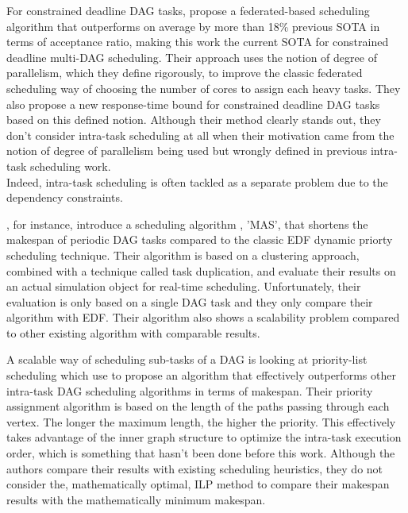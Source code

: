 For constrained deadline DAG tasks, 
\cite{He2023DegreeOfParallelism} propose a federated-based
scheduling algorithm that outperforms on average by more than 18\%
previous SOTA\cite{Jiang2023SchedVirtualProcs} in terms of acceptance
ratio, making this work the current SOTA for constrained deadline multi-DAG scheduling.
Their approach uses the notion of degree of parallelism, which they 
define rigorously, to improve the classic federated scheduling way of 
choosing the number of cores to assign each heavy tasks.
They also propose a new response-time bound for constrained deadline DAG tasks
based on this defined notion.
Although their method clearly stands out,
they don't consider intra-task scheduling at all 
when their motivation came from the notion 
of degree of parallelism being used
but wrongly defined in previous intra-task scheduling work\cite{Zhao2022DAGsched}\cite{zhao2020DAGsched}.\\


Indeed, intra-task scheduling\cite{He2019DagIntra}\cite{Xiao2019}
\cite{Shi2024DagExecGroups}\cite{Zhao2024GATDRLmodel}\cite{Lee2021GlobalDagSchedDRL}
\cite{GuanFRTDS2020RL} is often tackled as a separate
problem due to the dependency constraints.

\cite{Xiao2019}, for instance, introduce a scheduling algorithm 
, 'MAS', that shortens the makespan of periodic DAG tasks
compared to the classic EDF dynamic priorty scheduling technique.
Their algorithm is based on a clustering approach, combined with
a technique called task duplication, and evaluate their results
on an actual simulation object for real-time scheduling.
Unfortunately, their evaluation is only based on a single DAG task
and they only compare their algorithm with EDF.
Their algorithm also shows a scalability problem compared to 
other existing algorithm with comparable results.

A scalable way of scheduling sub-tasks of a DAG 
is looking at priority-list scheduling
which \cite{He2019DagIntra} use to propose 
an algorithm that effectively outperforms
other intra-task DAG scheduling algorithms
in terms of makespan.
Their priority assignment algorithm
is based on the length of the paths passing through each vertex.
The longer the maximum length, the higher the priority.
This effectively takes advantage of the inner graph structure
to optimize the intra-task execution order,
which is something that hasn't been done before this work.
Although the authors compare their results with existing
scheduling heuristics, they do not consider 
the, mathematically optimal, ILP method to compare
their makespan results with the mathematically minimum makespan.

